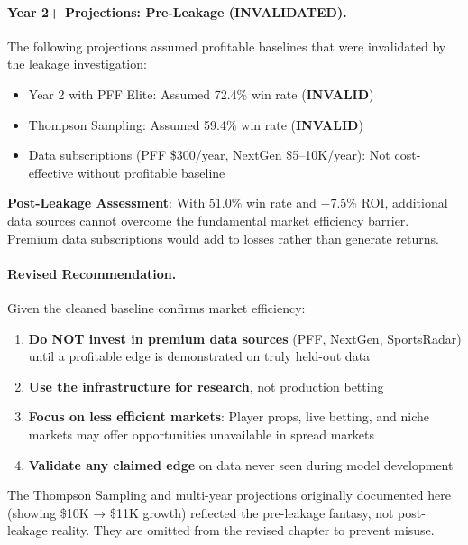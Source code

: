 \paragraph{Year 2+ Projections: Pre-Leakage (INVALIDATED).}
The following projections assumed profitable baselines that were invalidated by the leakage investigation:

\begin{itemize}
\item Year 2 with PFF Elite: Assumed 72.4\% win rate (\textbf{INVALID})
\item Thompson Sampling: Assumed 59.4\% win rate (\textbf{INVALID})
\item Data subscriptions (PFF \$300/year, NextGen \$5--10K/year): Not cost-effective without profitable baseline
\end{itemize}

\textbf{Post-Leakage Assessment}: With 51.0\% win rate and $-7.5$\% ROI, additional data sources cannot overcome the fundamental market efficiency barrier. Premium data subscriptions would add to losses rather than generate returns.

\paragraph{Revised Recommendation.}
Given the cleaned baseline confirms market efficiency:

\begin{enumerate}
\item \textbf{Do NOT invest in premium data sources} (PFF, NextGen, SportsRadar) until a profitable edge is demonstrated on truly held-out data
\item \textbf{Use the infrastructure for research}, not production betting
\item \textbf{Focus on less efficient markets}: Player props, live betting, and niche markets may offer opportunities unavailable in spread markets
\item \textbf{Validate any claimed edge} on data never seen during model development
\end{enumerate}

The Thompson Sampling and multi-year projections originally documented here (showing \$10K → \$11K growth) reflected the pre-leakage fantasy, not post-leakage reality. They are omitted from the revised chapter to prevent misuse.

